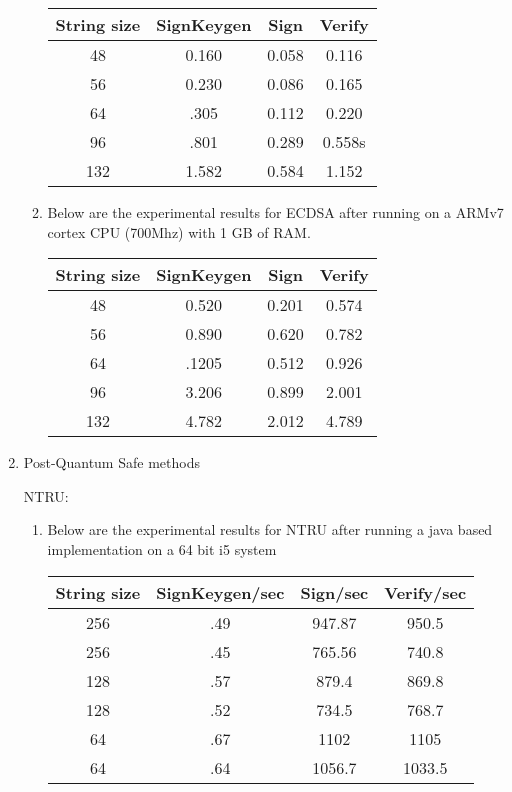 \documentclass[conference]{IEEEtran}
\begin{document}
\begin{enumerate}
\begin{enumerate}
\begin{center}
\small
\begin{tabular}{||c c c c||} 
\hline
String size & SignKeygen & Sign & Verify \\ [0.5ex] 
\hline\hline
48 & 0.160 & 0.058 & 0.116\\ 
\hline
56 & 0.230 & 0.086 & 0.165\\
\hline
64 & .305 & 0.112 & 0.220\\
\hline
96 & .801 & 0.289 & 0.558s\\
\hline
132 & 1.582 & 0.584 & 1.152\\
\hline
\hline
\end{tabular}
\end{center}

\item{ Below are the experimental results for ECDSA after running on a ARMv7 cortex CPU (700Mhz) with 1 GB of RAM.}

\begin{center}
\small
\begin{tabular}{||c c c c||} 
\hline
String size & SignKeygen & Sign & Verify \\ [0.5ex] 
\hline\hline
48 & 0.520 & 0.201 & 0.574\\ 
\hline
56 & 0.890 & 0.620 & 0.782\\
\hline
64 & .1205 & 0.512 & 0.926\\
\hline
96 & 3.206 & 0.899 & 2.001\\
\hline
132 & 4.782 & 2.012 & 4.789\\
\hline
\end{tabular}
\end{center}

\end{enumerate}


\item {Post-Quantum Safe methods}

NTRU:
\begin{enumerate}

\item{Below are the experimental results for NTRU after running a java based implementation on a 64 bit i5 system}

\begin{center}
\small
\begin{tabular}{||c c c c||} 
\hline
String size & SignKeygen/sec & Sign/sec & Verify/sec \\ [0.5ex] 
\hline\hline
256 & .49 & 947.87 & 950.5\\ 
\hline
256 & .45 & 765.56 & 740.8\\
\hline
128 & .57 & 879.4 & 869.8\\
\hline
128 & .52 & 734.5 & 768.7\\
\hline
64 & .67 & 1102 & 1105\\
\hline
64 & .64 & 1056.7 & 1033.5 \\
\hline
\end{tabular}
\end{center}


\end{enumerate}
\end{enumerate}
\end{document}
